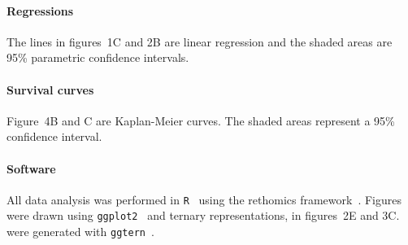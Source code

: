\documentclass[a4paper,twoside,openright]{article}
\begin{document}
\paragraph*{Regressions}
The lines in figures~1C and 2B are linear regression and the shaded areas are 95\% parametric confidence intervals.

\paragraph*{Survival curves}
Figure~4B and C are Kaplan-Meier curves.
The shaded areas represent a 95\% confidence interval.

\paragraph*{Software}
All data analysis was performed in \texttt{R}~\cite{r} using the rethomics framework~\cite{geissmann_rethomics:_2018}.
Figures were drawn using \texttt{ggplot2}~\cite{wickam_hadley_ggplot2_2009} and ternary representations, in figures~2E and 3C. were generated with \texttt{ggtern}~\cite{hamilton_ggtern:_2017}.

 

\end{document}
